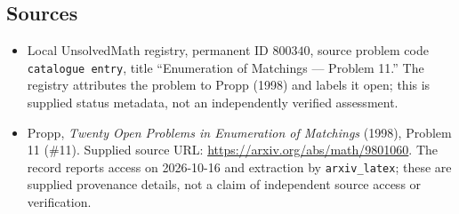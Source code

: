 \documentclass[11pt]{article}
\begin{document}
\subsection{Sources}
\begin{itemize}
\item Local UnsolvedMath registry, permanent ID \(800340\), source problem code \texttt{catalogue entry}, title ``Enumeration of Matchings --- Problem 11.'' The registry attributes the problem to Propp (1998) and labels it open; this is supplied status metadata, not an independently verified assessment.
\item Propp, \emph{Twenty Open Problems in Enumeration of Matchings} (1998), Problem 11 (\#11). Supplied source URL: \url{https://arxiv.org/abs/math/9801060}. The record reports access on 2026-10-16 and extraction by \texttt{arxiv\_latex}; these are supplied provenance details, not a claim of independent source access or verification.
\end{itemize}
\end{document}
